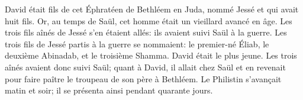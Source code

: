 David était fils de cet Éphratéen de Bethléem en Juda, nommé Jessé
	et qui avait huit fils.
Or, au temps de Saül, cet homme était un vieillard avancé en âge.
Les trois fils aînés de Jessé s’en étaient allés: ils avaient suivi Saül à la guerre.
Les trois fils de Jessé partis à la guerre se nommaient:
	le premier-né Éliab, le deuxième Abinadab, et le troisième Shamma.
	David était le plus jeune.
Les trois aînés avaient donc suivi Saül;
	quant à David, il allait chez Saül et en revenait
		pour faire paître le troupeau de son père à Bethléem.
Le Philistin s’avançait matin et soir; il se présenta ainsi pendant quarante jours.
